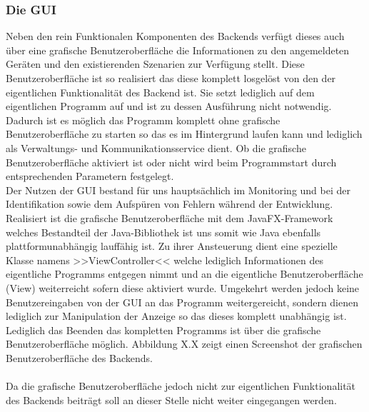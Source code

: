 \subsubsection{Die GUI}
Neben den rein Funktionalen Komponenten des Backends verfügt dieses auch über eine grafische Benutzeroberfläche die Informationen zu
den angemeldeten Geräten und den existierenden Szenarien zur Verfügung stellt. Diese Benutzeroberfläche ist so realisiert das diese 
komplett losgelöst von den der eigentlichen Funktionalität des Backend ist. Sie setzt lediglich auf dem eigentlichen Programm auf und
ist zu dessen Ausführung nicht notwendig. Dadurch ist es möglich das Programm komplett ohne grafische Benutzeroberfläche zu starten so
das es im Hintergrund laufen kann und lediglich als Verwaltungs- und Kommunikationsservice dient. Ob die grafische Benutzeroberfläche  
aktiviert ist oder nicht wird beim Programmstart durch entsprechenden Parametern festgelegt. \\
Der Nutzen der GUI bestand für uns hauptsächlich im Monitoring und bei der Identifikation sowie dem Aufspüren von Fehlern während der 
Entwicklung. \\
Realisiert ist die grafische Benutzeroberfläche mit dem JavaFX-Framework welches Bestandteil der Java-Bibliothek ist uns somit wie 
Java ebenfalls plattformunabhängig lauffähig ist. Zu ihrer Ansteuerung dient eine spezielle Klasse namens
>>ViewController<< welche lediglich Informationen des eigentliche Programms entgegen nimmt und an die eigentliche Benutzeroberfläche 
(View) weiterreicht sofern diese aktiviert wurde. Umgekehrt werden jedoch keine Benutzereingaben von der GUI an das Programm 
weitergereicht, sondern dienen lediglich zur Manipulation der Anzeige so das dieses komplett unabhängig ist. Lediglich das Beenden 
das kompletten Programms ist über die grafische Benutzeroberfläche möglich.
Abbildung X.X zeigt einen Screenshot der grafischen Benutzeroberfläche des Backends. \\
\\
Da die grafische Benutzeroberfläche jedoch nicht zur eigentlichen Funktionalität des Backends beiträgt soll an dieser Stelle nicht 
weiter eingegangen werden.

